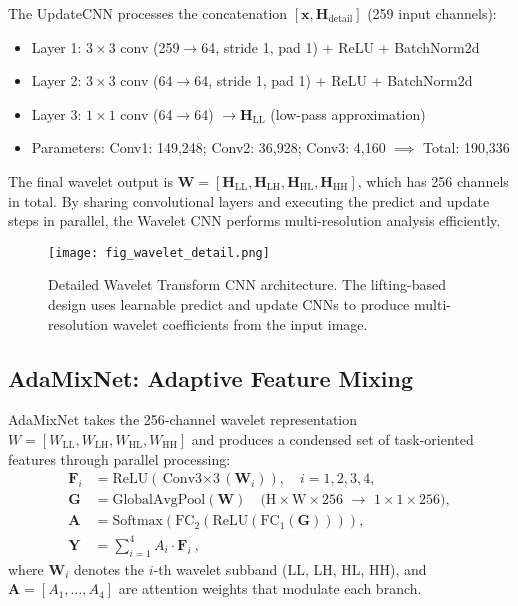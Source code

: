 \documentclass[conference]{IEEEtran}
\begin{document}
The UpdateCNN processes the concatenation $[\mathbf{x}, \mathbf{H}_{\text{detail}}]$ (259 input channels):
\begin{itemize}
\item Layer 1: $3\times 3$ conv (259$\to$64, stride 1, pad 1) + ReLU + BatchNorm2d
\item Layer 2: $3\times 3$ conv (64$\to$64, stride 1, pad 1) + ReLU + BatchNorm2d
\item Layer 3: $1\times 1$ conv (64$\to$64) $\to \mathbf{H}_{\text{LL}}$ (low-pass approximation)
\item Parameters: Conv1: 149,248; Conv2: 36,928; Conv3: 4,160 $\implies$ Total: 190,336
\end{itemize}

The final wavelet output is $\mathbf{W} = [\mathbf{H}_{\text{LL}}, \mathbf{H}_{\text{LH}}, \mathbf{H}_{\text{HL}}, \mathbf{H}_{\text{HH}}]$, which has 256 channels in total. By sharing convolutional layers and executing the predict and update steps in parallel, the Wavelet CNN performs multi-resolution analysis efficiently.

\begin{figure}[htbp]
\centering
\texttt{[image: fig\_wavelet\_detail.png]}
\caption{Detailed Wavelet Transform CNN architecture. The lifting-based design uses learnable predict and update CNNs to produce multi-resolution wavelet coefficients from the input image.}
\label{fig:wavelet_detail}
\end{figure}

\subsection{AdaMixNet: Adaptive Feature Mixing}

AdaMixNet takes the 256-channel wavelet representation $W = [W_{\text{LL}}, W_{\text{LH}}, W_{\text{HL}}, W_{\text{HH}}]$ and produces a condensed set of task-oriented features through parallel processing:
\begin{align}
\mathbf{F}_i &= \text{ReLU}(\text{Conv3$\times$3}(\mathbf{W}_i)), \quad i = 1,2,3,4, \\
\mathbf{G} &= \text{GlobalAvgPool}(\mathbf{W}) \quad \text{(H$\times$W$\times$256 $\to$ 1$\times$1$\times$256)}, \\
\mathbf{A} &= \text{Softmax}(\text{FC}_2(\text{ReLU}(\text{FC}_1(\mathbf{G})))),  \\
\mathbf{Y} &= \sum_{i=1}^{4} A_i \cdot \mathbf{F}_i~,
\end{align}
where $\mathbf{W}_i$ denotes the $i$-th wavelet subband (LL, LH, HL, HH), and $\mathbf{A} = [A_1,\dots,A_4]$ are attention weights that modulate each branch.
\end{document}
